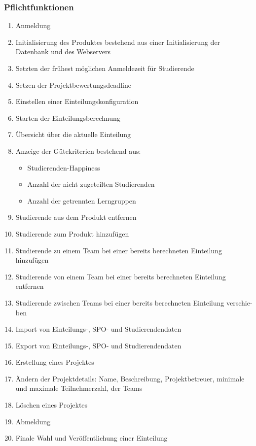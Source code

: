 \documentclass[parskip=full]{scrartcl}
\newcommand{\swtLabel}[1]{\textbf{/#1\arabic*0/}}
\begin{document}
\subsubsection{Pflichtfunktionen}
\begin{enumerate}[label=\swtLabel{FA}, resume]
  \item Anmeldung
  \item Initialisierung des Produktes bestehend aus einer Initialisierung der Datenbank
und des Webservers
\item Setzten der frühest möglichen Anmeldezeit für Studierende
\item Setzen der Projektbewertungsdeadline
\item Einstellen einer Einteilungskonfiguration
\item Starten der Einteilungsberechnung
\item Übersicht über die aktuelle Einteilung
\item Anzeige der Gütekriterien bestehend aus:
\begin{itemize}
  \item Studierenden-Happiness
  \item Anzahl der nicht zugeteilten Studierenden
  \item Anzahl der getrennten Lerngruppen
\end{itemize}
\item Studierende aus dem Produkt entfernen
\item Studierende zum Produkt hinzufügen
\item Studierende zu einem Team bei einer bereits berechneten Einteilung
hinzufügen
\item Studierende von einem Team bei einer bereits berechneten Einteilung
entfernen
\item Studierende zwischen Teams bei einer bereits berechneten Einteilung verschie-
ben
\item Import von Einteilungs-, SPO- und Studierendendaten
\item Export von Einteilungs-, SPO- und Studierendendaten
\item Erstellung eines Projektes
\item Ändern der Projektdetails: Name, Beschreibung, Projektbetreuer, minimale
und maximale Teilnehmerzahl, der Teams
\item Löschen eines Projektes
\item Abmeldung
\item Finale Wahl und Veröffentlichung einer Einteilung
\end{enumerate}
\end{document}
